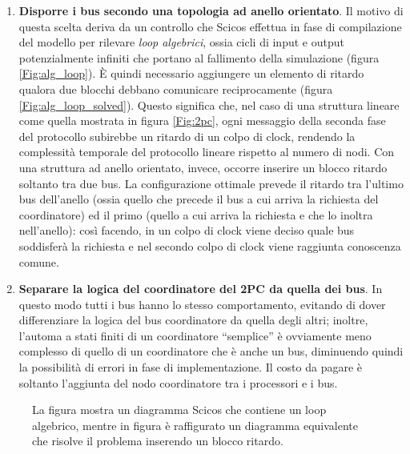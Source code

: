\begin{enumerate}
\item \textbf{Disporre i bus secondo una topologia ad anello orientato}. Il motivo di questa scelta deriva da un controllo che Scicos effettua in fase di compilazione del modello per rilevare \textsl{loop algebrici}, ossia cicli di input e output potenzialmente infiniti che portano al fallimento della simulazione (figura \ref{Fig:alg_loop}). È quindi necessario aggiungere un elemento di ritardo qualora due blocchi debbano comunicare reciprocamente (figura \ref{Fig:alg_loop_solved}). Questo significa che, nel caso di una struttura lineare come quella mostrata in figura \ref{Fig:2pc}, ogni messaggio della seconda fase del protocollo subirebbe un ritardo di un colpo di clock, rendendo la complessità temporale del protocollo lineare rispetto al numero di nodi. Con una struttura ad anello orientato, invece, occorre inserire un blocco ritardo soltanto tra due bus. La configurazione ottimale prevede il ritardo tra l'ultimo bus dell'anello (ossia quello che precede il bus a cui arriva la richiesta del coordinatore) ed il primo (quello a cui arriva la richiesta e che lo inoltra nell'anello): così facendo, in un colpo di clock viene deciso quale bus soddisferà la richiesta e nel secondo colpo di clock viene raggiunta conoscenza comune.
\item \textbf{Separare la logica del coordinatore del 2PC da quella dei bus}. In questo modo tutti i bus hanno lo stesso comportamento, evitando di dover differenziare la logica del bus coordinatore da quella degli altri; inoltre, l'automa a stati finiti di un coordinatore \textquotedblleft semplice\textquotedblright{} è ovviamente meno complesso di quello di un coordinatore che è anche un bus, diminuendo quindi la possibilità di errori in fase di implementazione. Il costo da pagare è soltanto l'aggiunta del nodo coordinatore tra i processori e i bus.
\end{enumerate}

\begin{figure}
\caption{La figura  mostra un diagramma Scicos che contiene un loop algebrico, mentre in figura  è raffigurato un diagramma equivalente che risolve il problema inserendo un blocco ritardo.}
\label{Fig:loops}
\end{figure}

